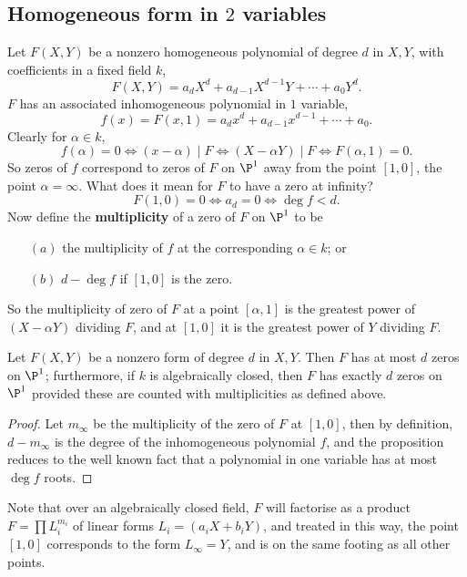 \subsection{Homogeneous form in \boldmath$2$ variables}
Let $F(X,Y)$ be a nonzero homogeneous polynomial of degree $d$ in $X,Y$, with coefficients in a fixed field $k$,
\[F(X,Y)=a_dX^d+a_{d-1}X^{d-1}Y+\cdots+a_0Y^d.\]
$F$ has an associated inhomogeneous polynomial in $1$ variable,
\[f(x)=F(x,1)=a_dx^d+a_{d-1}x^{d-1}+\cdots+a_0.\]
Clearly for $\alpha\in k$,
\[f(\alpha)=0\iff (x-\alpha)\mid F\iff (X-\alpha Y)\mid F\iff F(\alpha,1)=0.\]
So zeros of $f$ correspond to zeros of $F$ on $\P^1$ away from the point $[1,0]$, the point $\alpha=\infty$. What does it mean for $F$ to have a zero at infinity?
\[F(1,0)=0\iff a_d=0\iff \deg f<d.\]
Now define the \textbf{multiplicity} of a zero of $F$ on $\P^1$ to be
\begin{itemize}
\item[$(a)$] the multiplicity of $f$ at the corresponding $\alpha\in k$; or
\item[$(b)$] $d-\deg f$ if $[1,0]$ is the zero.
\end{itemize}
So the multiplicity of zero of $F$ at a point $[\alpha,1]$ is the greatest power of $(X-\alpha Y)$ dividing $F$, and at $[1,0]$ it is the greatest power of $Y$ dividing $F$.
\begin{proposition}\label{form two var zero}
Let $F(X,Y)$ be a nonzero form of degree $d$ in $X,Y$. Then $F$ has at most $d$ zeros on $\P^1$; furthermore, if $k$ is algebraically closed, then $F$ has exactly $d$ zeros on $\P^1$ provided these are counted with multiplicities as defined above.
\end{proposition}
\begin{proof}
Let $m_\infty$ be the multiplicity of the zero of $F$ at $[1,0]$, then by definition, $d-m_\infty$ is the degree of the inhomogeneous polynomial $f$, and the proposition reduces to the well known fact that a polynomial in one variable has at most $\deg f$ roots.
\end{proof}
Note that over an algebraically closed field, $F$ will factorise as a product $F=\prod L_i^{m_i}$ of linear forms $L_i=(a_iX+b_iY)$, and treated in this way, the point $[1,0]$ corresponds to the form $L_\infty=Y$, and is on the same footing as all other points.
